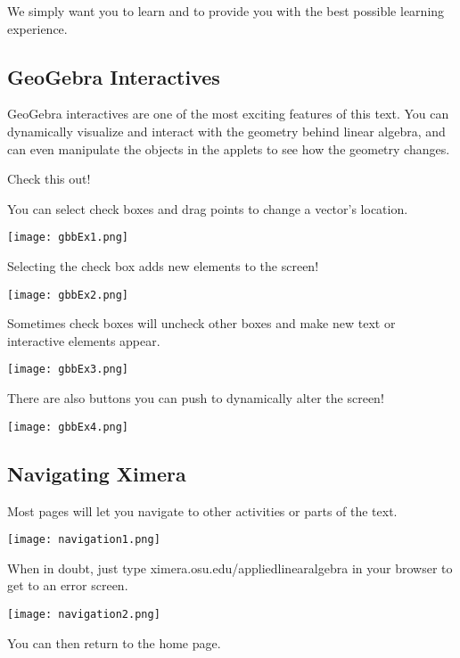 \documentclass{ximera}
\begin{document}
 
We simply want you to learn and to provide you with the best possible
learning experience.
 
\subsection*{GeoGebra Interactives}
GeoGebra interactives are one of the most exciting features of this text. You can dynamically visualize and interact with the geometry behind linear algebra, and can even manipulate the objects in the applets to see how the geometry changes. 

Check this out!

\begin{center}
\end{center}

You can select check boxes and drag points to change a vector's location.

\begin{center}
  \texttt{[image: gbbEx1.png]}
\end{center}

Selecting the check box adds new elements to the screen!

\begin{center}
  \texttt{[image: gbbEx2.png]}
\end{center}

Sometimes check boxes will uncheck other boxes and make new text or interactive elements appear.

\begin{center}
  \texttt{[image: gbbEx3.png]}
\end{center}

There are also buttons you can push to dynamically alter the screen!

\begin{center}
  \texttt{[image: gbbEx4.png]}
\end{center}

\subsection*{Navigating Ximera}

Most pages will let you navigate to other activities or parts of the text.  

\begin{center}
  \texttt{[image: navigation1.png]}
\end{center}

When in doubt, just type ximera.osu.edu/appliedlinearalgebra in your browser to get to an error screen.

\begin{center}
  \texttt{[image: navigation2.png]}
\end{center}

You can then return to the home page.
\end{document}
